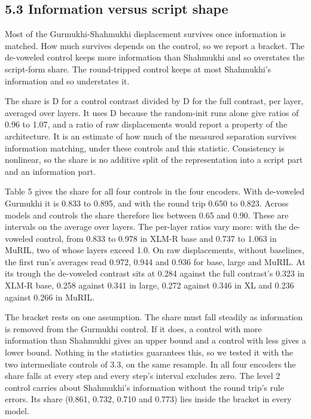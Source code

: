 \hypertarget{information-versus-script-shape}{%
\subsection{5.3 Information versus script
shape}\label{information-versus-script-shape}}

Most of the Gurmukhi-Shahmukhi displacement survives once information is
matched. How much survives depends on the control, so we report a
bracket. The de-voweled control keeps more information than Shahmukhi
and so overstates the script-form share. The round-tripped control keeps
at most Shahmukhi's information and so understates it.

The share is D for a control contrast divided by D for the full
contrast, per layer, averaged over layers. It uses D because the
random-init runs alone give ratios of 0.96 to 1.07, and a ratio of raw
displacements would report a property of the architecture. It is an
estimate of how much of the measured separation survives information
matching, under these controls and this statistic. Consistency is
nonlinear, so the share is no additive split of the representation into
a script part and an information part.

Table 5 gives the share for all four controls in the four encoders. With
de-voweled Gurmukhi it is 0.833 to 0.895, and with the round trip 0.650
to 0.823. Across models and controls the share therefore lies between
0.65 and 0.90. These are intervals on the average over layers. The
per-layer ratios vary more: with the de-voweled control, from 0.833 to
0.978 in XLM-R base and 0.737 to 1.063 in MuRIL, two of whose layers
exceed 1.0. On raw displacements, without baselines, the first run's
averages read 0.972, 0.944 and 0.936 for base, large and MuRIL. At its
trough the de-voweled contrast sits at 0.284 against the full contrast's
0.323 in XLM-R base, 0.258 against 0.341 in large, 0.272 against 0.346
in XL and 0.236 against 0.266 in MuRIL.

The bracket rests on one assumption. The share must fall steadily as
information is removed from the Gurmukhi control. If it does, a control
with more information than Shahmukhi gives an upper bound and a control
with less gives a lower bound. Nothing in the statistics guarantees
this, so we tested it with the two intermediate controls of 3.3, on the
same resample. In all four encoders the share falls at every step and
every step's interval excludes zero. The level 2 control carries about
Shahmukhi's information without the round trip's rule errors. Its share
(0.861, 0.732, 0.710 and 0.773) lies inside the bracket in every model.

